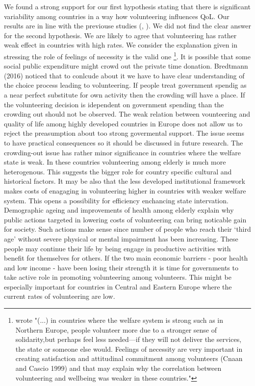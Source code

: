 \documentclass[10pt, letterpaper]{article}
\begin{document}
\begin{spacing}{1.4}
We found a strong support for our first hypothesis stating that there is significant variability among countries in a way how volunteering influences QoL.  Our results are in line with the previouse studies (\citet{haski09}, \citet{plagnol10}). We did not find the clear answer for the second hypothesis. We are likely to agree that volunteering has rather weak effect in countries with high rates. We consider the explanation given in \citet{haski09} stressing the role of feelings of necessity is the valid one \footnote{\citet{haski09} wrote "(...) in countries where the welfare system is strong such as in Northern Europe, people volunteer more due to a stronger sense of solidarity,but perhaps feel less needed—if they will not deliver the services, the state or someone else would. Feelings of necessity are very important in creating satisfaction and attitudinal commitment among volunteers (Cnaan and Cascio 1999) and that may explain why the correlation between volunteering and wellbeing was weaker in these countries."}. It is possible that some social public expenditure might crowd out the private time donation. Bredtmann (2016) noticed that to conlcude about it we have to have clear understanding of the choice process leading to volunteering. If people treat government spendig as a near perfect substitute for own activity then the crowding will have a place. If the volunteering decision is idependent on government spending than the crowding out should not be observed. The weak relation between vounteering and quality of life among highly developed countries in Europe does not allow us to reject the preasumption about too strong govermental support. The issue seems to have practical consequences so it should be discussed in future research.     
The crowding-out issue has rather minor significance in countries where the welfare state is weak. In these countries  volunteering among elderly is much more heterogenous. This suggests the bigger role for country specific cultural and historical factors. It may be also that the less developed  institutional framework makes costs of enagaging in volunteering higher in countries with weaker welfare system. This opens a possibility for efficiency enchancing state intervation. Demographic ageing and improvements of  health among elderly explain why public actions targeted in lowering costs of volunteering can bring noticable gain for society. Such actions make sense since number of people who reach their ‘third age’ without severe physical or mental impairment has been increasing. These people may continue their life by being engage in productive activities with benefit for themselves for others. If the two main economic barriers -  poor health and low income - have been losing their strength it is time for governments to take active role in promoting volunteering among volunteers. This might be especially important for countries in Central and Eastern Europe where the current rates of volunteering are low. 



\end{spacing}
\end{document}
